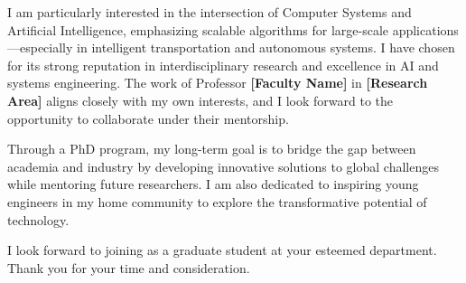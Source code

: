 
I am particularly interested in the intersection of Computer Systems and Artificial Intelligence,
emphasizing scalable algorithms for large-scale applications—especially in intelligent transportation
and autonomous systems. I have chosen \textbf{\GetUniversityName} for its strong reputation in
interdisciplinary research and excellence in AI and systems engineering.
The work of Professor \textbf{[Faculty Name]} in \textbf{[Research Area]} aligns closely with my own
interests, and I look forward to the opportunity to collaborate under their mentorship.

Through a PhD program, my long-term goal is to bridge the gap between academia and industry by
developing innovative solutions to global challenges while mentoring future researchers.
I am also dedicated to inspiring young engineers in my home community to explore the transformative
potential of technology.

I look forward to joining \textbf{\GetUniversityName} as a graduate student at your esteemed department.
Thank you for your time and consideration.
